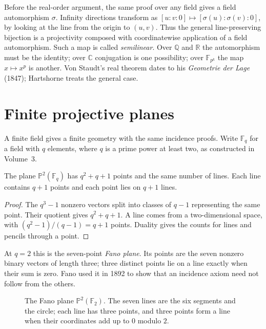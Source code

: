 \begin{remark}
Before the real-order argument, the same proof over any field gives a field automorphism $\sigma$. Infinity directions transform as $[u:v:0]\mapsto[\sigma(u):\sigma(v):0]$, by looking at the line from the origin to $(u,v)$. Thus the general line-preserving bijection is a projectivity composed with coordinatewise application of a field automorphism. Such a map is called \emph{semilinear}. Over $\mathbb Q$ and $\mathbb R$ the automorphism must be the identity; over $\mathbb C$ conjugation is one possibility; over $\mathbb F_{p^k}$ the map $x\mapsto x^p$ is another. Von Staudt's real theorem dates to his \emph{Geometrie der Lage} (1847); Hartshorne treats the general case.
\end{remark}

\section{Finite projective planes}\label{geometry:sec:finiteplanes}

A finite field gives a finite geometry with the same incidence proofs. Write $\mathbb F_q$ for a field with $q$ elements, where $q$ is a prime power at least two, as constructed in Volume~3.

\begin{proposition}\label{geometry:prop:countplane}
The plane $\mathbb P^2(\mathbb F_q)$ has $q^2+q+1$ points and the same number of lines. Each line contains $q+1$ points and each point lies on $q+1$ lines.
\end{proposition}
\begin{proof}
The $q^3-1$ nonzero vectors split into classes of $q-1$ representing the same point. Their quotient gives $q^2+q+1$. A line comes from a two-dimensional space, with $(q^2-1)/(q-1)=q+1$ points. Duality gives the counts for lines and pencils through a point.
\end{proof}

At $q=2$ this is the seven-point \emph{Fano plane}. Its points are the seven nonzero binary vectors of length three; three distinct points lie on a line exactly when their sum is zero. Fano used it in 1892 to show that an incidence axiom need not follow from the others.

\begin{figure}[ht]
\centering
{}
\caption{The Fano plane $\mathbb P^2(\mathbb F_2)$. The seven lines are the six segments and the circle; each line has three points, and three
points form a line when their coordinates add up to $0$ modulo $2$.}
\label{geometry:fig:fano}
\end{figure}

